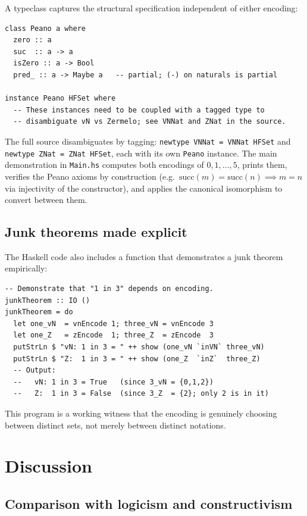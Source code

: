 \documentclass[12pt]{article}
\theoremstyle{definition}
\theoremstyle{remark}
\begin{document}
A typeclass captures the structural specification independent of either
encoding:

\begin{lstlisting}
class Peano a where
  zero :: a
  suc  :: a -> a
  isZero :: a -> Bool
  pred_ :: a -> Maybe a   -- partial; (-) on naturals is partial

instance Peano HFSet where
  -- These instances need to be coupled with a tagged type to
  -- disambiguate vN vs Zermelo; see VNNat and ZNat in the source.
\end{lstlisting}

The full source disambiguates by tagging: \texttt{newtype VNNat = VNNat HFSet}
and \texttt{newtype ZNat = ZNat HFSet}, each with its own \texttt{Peano} instance.
The main demonstration in \texttt{Main.hs} computes both encodings of
$0,1,\ldots,5$, prints them, verifies the Peano axioms by construction (e.g.\
$\mathrm{succ}(m) = \mathrm{succ}(n) \implies m = n$ via injectivity of the
constructor), and applies the canonical isomorphism to convert between them.

\subsection{Junk theorems made explicit}

The Haskell code also includes a function that demonstrates a junk theorem
empirically:

\begin{lstlisting}
-- Demonstrate that "1 in 3" depends on encoding.
junkTheorem :: IO ()
junkTheorem = do
  let one_vN  = vnEncode 1; three_vN = vnEncode 3
  let one_Z   = zEncode  1; three_Z  = zEncode  3
  putStrLn $ "vN: 1 in 3 = " ++ show (one_vN `inVN` three_vN)
  putStrLn $ "Z:  1 in 3 = " ++ show (one_Z  `inZ`  three_Z)
  -- Output:
  --   vN: 1 in 3 = True   (since 3_vN = {0,1,2})
  --   Z:  1 in 3 = False  (since 3_Z  = {2}; only 2 is in it)
\end{lstlisting}

This program is a working witness that the encoding is genuinely choosing
between distinct sets, not merely between distinct notations.

\section{Discussion}
\label{sec:discussion}

\subsection{Comparison with logicism and constructivism}
\end{document}
